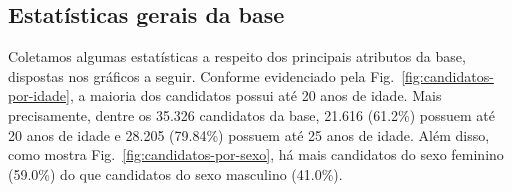\documentclass[12pt]{article}
\newcommand{\reffig}[1]{Fig.~\ref{fig:#1}}
\begin{document}
\subsection{Estatísticas gerais da base}
\label{subsec:estatisticas-gerais}
Coletamos algumas estatísticas a respeito dos principais atributos da base, dispostas nos gráficos a seguir.
Conforme evidenciado pela \reffig{candidatos-por-idade}, a maioria dos candidatos possui até 20 anos de idade.
Mais precisamente, dentre os 35.326 candidatos da base, 21.616 (61.2\%) possuem até 20 anos de idade e 28.205 (79.84\%) possuem até 25 anos de idade.
Além disso, como mostra \reffig{candidatos-por-sexo}, há mais candidatos do sexo feminino (59.0\%) do que candidatos do sexo masculino (41.0\%).
\end{document}
